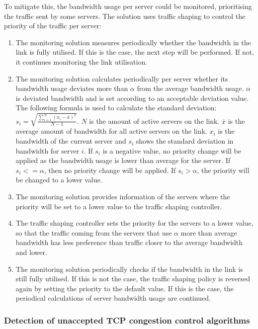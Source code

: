 \documentclass{article}
\begin{document}
To mitigate this, the bandwidth usage per server could be monitored, prioritising the traffic sent by some servers. The solution uses traffic shaping to control the priority of the traffic per server:

\begin{enumerate}
	\item The monitoring solution measures periodically whether the bandwidth in the link is fully utilised. If this is the case, the next step will be performed. If not, it continues monitoring the link utilisation.
	\item The monitoring solution calculates periodically per server whether its bandwidth usage deviates more than $\alpha$ from the average bandwidth usage. $\alpha$ is deviated bandwidth and is set according to an acceptable deviation value. The following formula is used to calculate the standard deviation: $s_{i} = \sqrt{\frac{\sum_{i=1}^N (x_i - \overline{x})^2}{N-1} }$. $N$ is the amount of active servers on the link. $\overline{x}$ is the average amount of bandwidth for all active servers on the link. $x_i$ is the bandwidth of the current server and $s_{i}$ shows the standard deviation in bandwidth for server $i$. If $s_{i}$ is a negative value, no priority change will be applied as the bandwidth usage is lower than average for the server. If $s_{i} <= \alpha$, then no priority change will be applied. If $s_{i} > \alpha$, the priority will be changed to a lower value.
	\item The monitoring solution provides information of the servers where the priority will be set to a lower value to the traffic shaping controller.
	\item The traffic shaping controller sets the priority for the servers to a lower value, so that the traffic coming from the servers that use $\alpha$ more than average bandwidth has less preference than traffic closer to the average bandwidth and lower.
	\item The monitoring solution periodically checks if the bandwidth in the link is still fully utilised. If this is not the case, the traffic shaping policy is reversed again by setting the priority to the default value. If this is the case, the periodical calculations of server bandwidth usage are continued.
\end{enumerate}

\subsubsection{Detection of unaccepted TCP congestion control algorithms}
\end{document}
